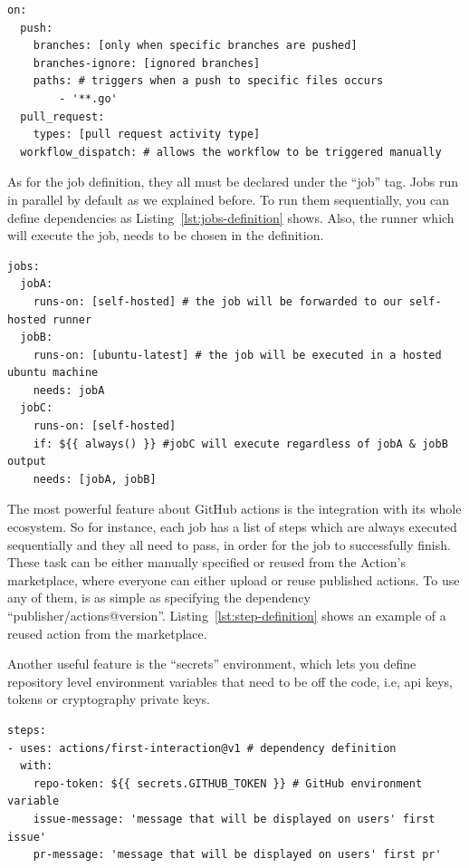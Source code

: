 \begin{lstlisting}[caption=Common Workflow Triggers,label={lst:trigger-options}]
on:
  push:
    branches: [only when specific branches are pushed]
    branches-ignore: [ignored branches]
    paths: # triggers when a push to specific files occurs
        - '**.go'
  pull_request:
    types: [pull request activity type]
  workflow_dispatch: # allows the workflow to be triggered manually
\end{lstlisting}

As for the job definition, they all must be declared under the \enquote{job} tag. Jobs run in parallel by default as we explained before. To run them sequentially, you can define dependencies as Listing~\ref{lst:jobs-definition} shows. Also, the runner which will execute the job, needs to be chosen in the definition.

\begin{lstlisting}[caption=Job Dependencies Definition,label={lst:jobs-definition}]
jobs:
  jobA:
    runs-on: [self-hosted] # the job will be forwarded to our self-hosted runner
  jobB:
    runs-on: [ubuntu-latest] # the job will be executed in a hosted ubuntu machine
    needs: jobA
  jobC:
    runs-on: [self-hosted]
    if: ${{ always() }} #jobC will execute regardless of jobA & jobB output
    needs: [jobA, jobB]
\end{lstlisting}

The most powerful feature about GitHub actions is the integration with its whole ecosystem. So for instance, each job has a list of steps which are always executed sequentially and they all need to pass, in order for the job to successfully finish. These task can be either manually specified or reused from the Action's marketplace, where everyone can either upload or reuse published actions. To use any of them, is as simple as specifying the dependency \enquote{publisher/actions@version}. Listing~\ref{lst:step-definition} shows an example of a reused action from the marketplace.

Another useful feature is the \enquote{secrets} environment, which lets you define repository level environment variables that need to be off the code, i.e, \gls{api} keys, tokens or cryptography private keys.

\begin{lstlisting}[caption=Steps Definition,label={lst:step-definition}]
steps:
- uses: actions/first-interaction@v1 # dependency definition
  with:
    repo-token: ${{ secrets.GITHUB_TOKEN }} # GitHub environment variable
    issue-message: 'message that will be displayed on users' first issue'
    pr-message: 'message that will be displayed on users' first pr'
\end{lstlisting}

